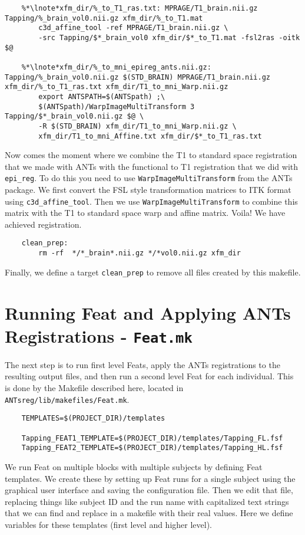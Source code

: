 \begin{lstlisting}
	%*\lnote*xfm_dir/%_to_T1_ras.txt: MPRAGE/T1_brain.nii.gz Tapping/%_brain_vol0.nii.gz xfm_dir/%_to_T1.mat
		c3d_affine_tool -ref MPRAGE/T1_brain.nii.gz \
		-src Tapping/$*_brain_vol0 xfm_dir/$*_to_T1.mat -fsl2ras -oitk $@

	%*\lnote*xfm_dir/%_to_mni_epireg_ants.nii.gz: Tapping/%_brain_vol0.nii.gz $(STD_BRAIN) MPRAGE/T1_brain.nii.gz xfm_dir/%_to_T1_ras.txt xfm_dir/T1_to_mni_Warp.nii.gz
		export ANTSPATH=$(ANTSpath) ;\
		$(ANTSpath)/WarpImageMultiTransform 3 Tapping/$*_brain_vol0.nii.gz $@ \
		-R $(STD_BRAIN) xfm_dir/T1_to_mni_Warp.nii.gz \
		xfm_dir/T1_to_mni_Affine.txt xfm_dir/$*_to_T1_ras.txt
\end{lstlisting}
Now comes the moment where we combine the T1 to standard space
registration that we made with ANTs with the functional to T1
registration that we did with \texttt{epi_reg}. To do this you need to
use \texttt{WarpImageMultiTransform} from the ANTs
package. \lnum{10} We first convert the FSL style transformation matrices to ITK
format using \texttt{c3d_affine_tool}. \lnum{11} Then we use
\texttt{WarpImageMultiTransform} to combine this matrix with the T1 to
standard space warp and affine matrix. Voila! We have achieved
registration. 

\begin{lstlisting}
	clean_prep:
		rm -rf  */*_brain*.nii.gz */*vol0.nii.gz xfm_dir
\end{lstlisting}

Finally, we define a target \texttt{clean_prep} to remove all files
created by this makefile.


\section{Running Feat and Applying ANTs Registrations -
  \texttt{Feat.mk}}
The next step is to run first level Feats, apply the ANTs
registrations to the resulting output files, and then run a second
level Feat for each individual. This is done by the Makefile described
here, located in \texttt{ANTsreg/lib/makefiles/Feat.mk}.

\begin{lstlisting}
	TEMPLATES=$(PROJECT_DIR)/templates

	Tapping_FEAT1_TEMPLATE=$(PROJECT_DIR)/templates/Tapping_FL.fsf
	Tapping_FEAT2_TEMPLATE=$(PROJECT_DIR)/templates/Tapping_HL.fsf	
\end{lstlisting}

We run Feat on multiple blocks with multiple subjects by defining Feat
templates. We create these by setting up Feat runs for a single
subject using the graphical user interface and saving the
configuration file. Then we edit that file, replacing things like
subject ID and the run name with capitalized text strings that we can
find and replace in a makefile with their real values. Here we define
variables for these templates (first level and higher level).


